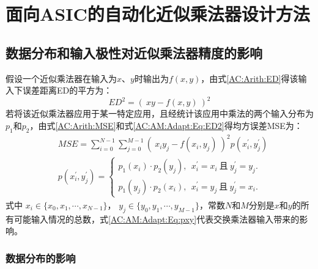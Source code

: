 \chapter{面向ASIC的自动化近似乘法器设计方法}


\section{数据分布和输入极性对近似乘法器精度的影响}

假设一个近似乘法器在输入为$x$、$y$时输出为$f(x,y)$，由式\eqref{AC:Arith:ED}得该输入下误差距离ED的平方为：
\begin{equation}
    ED^2 = ( \ xy - f(x,y) \ ) ^2
\label{AC:AM:Adapt:Eq:ED2}
\end{equation}
若将该近似乘法器应用于某一特定应用，且经统计该应用中乘法的两个输入分布为$p_1$和$p_2$，由式\eqref{AC:Arith:MSE}和式\eqref{AC:AM:Adapt:Eq:ED2}得均方误差MSE为：
\begin{align}
    & MSE = \sum_{i=0}^{N-1} \sum_{j=0}^{M-1} ( \ x_i y_j - f(x_i,y_j) \ ) ^2 p(x^{\prime}_i, y^{\prime}_j) \label{AC:AM:Adapt:Eq:MSE} \\
    & p(x^{\prime}_i, y^{\prime}_j) = \left\{
        \begin{aligned}
          p_1(x_i) \cdot p_2(y_j),\ \ x^{\prime}_i=x_i\ \text{且}\ y^{\prime}_j=y_j. \\
          p_1(y_j) \cdot p_2(x_i),\ \ x^{\prime}_i=y_j\ \text{且}\ y^{\prime}_j=x_i.
        \end{aligned}
        \right.      \label{AC:AM:Adapt:Eq:pxy}
\end{align}
式中 $x_i \in \{x_0, x_1, \cdots , x_{N-1}\}$， $y_j \in \{y_0, y_1, \cdots , y_{M-1}\}$，常数$N$和$M$分别是$x$和$y$的所有可能输入情况的总数，式\eqref{AC:AM:Adapt:Eq:pxy}代表交换乘法器输入带来的影响。

\subsection{数据分布的影响}

